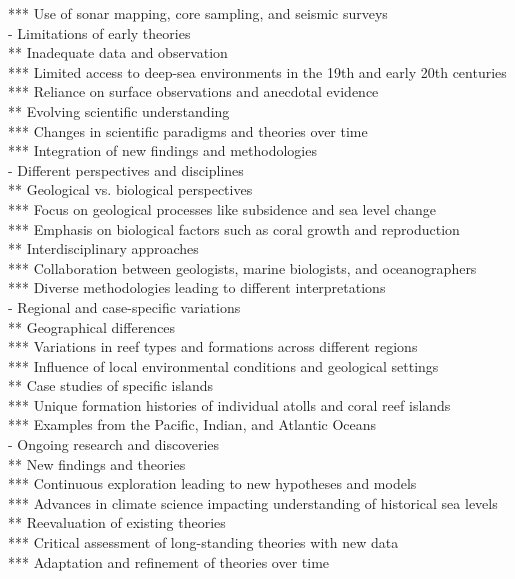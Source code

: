 *** Use of sonar mapping, core sampling, and seismic surveys \\
- Limitations of early theories \\
** Inadequate data and observation \\
*** Limited access to deep-sea environments in the 19th and early 20th centuries \\
*** Reliance on surface observations and anecdotal evidence \\
** Evolving scientific understanding \\
*** Changes in scientific paradigms and theories over time \\
*** Integration of new findings and methodologies \\
- Different perspectives and disciplines \\
** Geological vs. biological perspectives \\
*** Focus on geological processes like subsidence and sea level change \\
*** Emphasis on biological factors such as coral growth and reproduction \\
** Interdisciplinary approaches \\
*** Collaboration between geologists, marine biologists, and oceanographers \\
*** Diverse methodologies leading to different interpretations \\
- Regional and case-specific variations \\
** Geographical differences \\
*** Variations in reef types and formations across different regions \\
*** Influence of local environmental conditions and geological settings \\
** Case studies of specific islands \\
*** Unique formation histories of individual atolls and coral reef islands \\
*** Examples from the Pacific, Indian, and Atlantic Oceans \\
- Ongoing research and discoveries \\
** New findings and theories \\
*** Continuous exploration leading to new hypotheses and models \\
*** Advances in climate science impacting understanding of historical sea levels \\
** Reevaluation of existing theories \\
*** Critical assessment of long-standing theories with new data \\
*** Adaptation and refinement of theories over time


